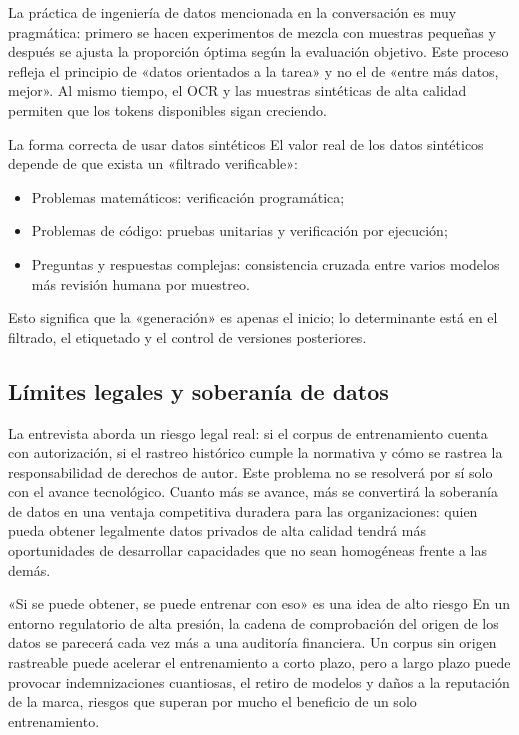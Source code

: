 \documentclass[a4paper]{article}
\begin{document}
La práctica de ingeniería de datos mencionada en la conversación es muy pragmática: primero se hacen experimentos de mezcla con muestras pequeñas y después se ajusta la proporción óptima según la evaluación objetivo. Este proceso refleja el principio de «datos orientados a la tarea» y no el de «entre más datos, mejor». Al mismo tiempo, el OCR y las muestras sintéticas de alta calidad permiten que los tokens disponibles sigan creciendo.

\begin{importantbox}{La forma correcta de usar datos sintéticos}
El valor real de los datos sintéticos depende de que exista un «filtrado verificable»:
\begin{itemize}[leftmargin=1.5em]
    \item Problemas matemáticos: verificación programática;
    \item Problemas de código: pruebas unitarias y verificación por ejecución;
    \item Preguntas y respuestas complejas: consistencia cruzada entre varios modelos más revisión humana por muestreo.
\end{itemize}
Esto significa que la «generación» es apenas el inicio; lo determinante está en el filtrado, el etiquetado y el control de versiones posteriores.
\end{importantbox}

\subsection{Límites legales y soberanía de datos}

La entrevista aborda un riesgo legal real: si el corpus de entrenamiento cuenta con autorización, si el rastreo histórico cumple la normativa y cómo se rastrea la responsabilidad de derechos de autor. Este problema no se resolverá por sí solo con el avance tecnológico. Cuanto más se avance, más se convertirá la soberanía de datos en una ventaja competitiva duradera para las organizaciones: quien pueda obtener legalmente datos privados de alta calidad tendrá más oportunidades de desarrollar capacidades que no sean homogéneas frente a las demás.

\begin{warningbox}{«Si se puede obtener, se puede entrenar con eso» es una idea de alto riesgo}
En un entorno regulatorio de alta presión, la cadena de comprobación del origen de los datos se parecerá cada vez más a una auditoría financiera. Un corpus sin origen rastreable puede acelerar el entrenamiento a corto plazo, pero a largo plazo puede provocar indemnizaciones cuantiosas, el retiro de modelos y daños a la reputación de la marca, riesgos que superan por mucho el beneficio de un solo entrenamiento.
\end{warningbox}
\end{document}
